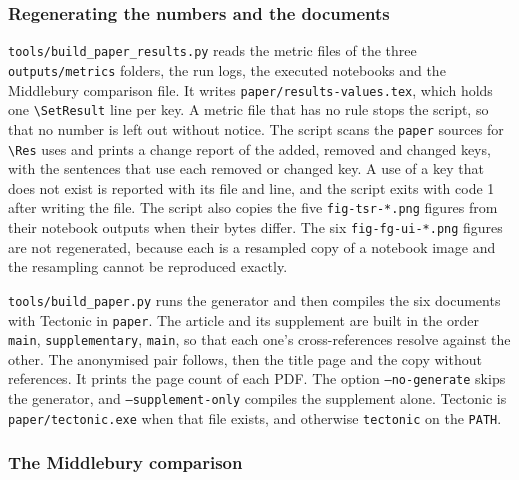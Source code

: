 \subsubsection{Regenerating the numbers and the documents}\label{sec:app-generate}

\texttt{tools/build\_paper\_results.py} reads the metric files of the three \texttt{outputs/metrics} folders, the run logs, the executed notebooks and the Middlebury comparison file. It writes \texttt{paper/results-values.tex}, which holds one \texttt{\textbackslash SetResult} line per key. A metric file that has no rule stops the script, so that no number is left out without notice. The script scans the \texttt{paper} sources for \texttt{\textbackslash Res} uses and prints a change report of the added, removed and changed keys, with the sentences that use each removed or changed key. A use of a key that does not exist is reported with its file and line, and the script exits with code 1 after writing the file. The script also copies the five \texttt{fig-tsr-*.png} figures from their notebook outputs when their bytes differ. The six \texttt{fig-fg-ui-*.png} figures are not regenerated, because each is a resampled copy of a notebook image and the resampling cannot be reproduced exactly.

\texttt{tools/build\_paper.py} runs the generator and then compiles the six documents with Tectonic in \texttt{paper}. The article and its supplement are built in the order \texttt{main}, \texttt{supplementary}, \texttt{main}, so that each one's cross-references resolve against the other. The anonymised pair follows, then the title page and the copy without references. It prints the page count of each PDF. The option \texttt{--no-generate} skips the generator, and \texttt{--supplement-only} compiles the supplement alone. Tectonic is \texttt{paper/tectonic.exe} when that file exists, and otherwise \texttt{tectonic} on the \texttt{PATH}.

\subsubsection{The Middlebury comparison}\label{sec:app-mb}

